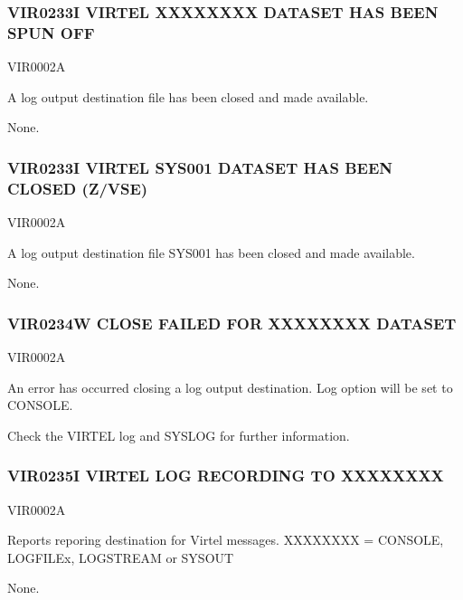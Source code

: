 \documentclass[letterpaper,10pt,english]{sphinxmanual}
\begin{document}
\subsubsection{VIR0233I VIRTEL XXXXXXXX DATASET HAS BEEN SPUN OFF}
\label{\detokenize{messages:vir0233i-virtel-xxxxxxxx-dataset-has-been-spun-off}}\begin{description}
\sphinxAtStartPar
VIR0002A

\sphinxAtStartPar
A log output destination file has been closed and made available.

\sphinxAtStartPar
None.

\end{description}


\subsubsection{VIR0233I VIRTEL SYS001 DATASET HAS BEEN CLOSED (Z/VSE)}
\label{\detokenize{messages:vir0233i-virtel-sys001-dataset-has-been-closed-z-vse}}\begin{description}
\sphinxAtStartPar
VIR0002A

\sphinxAtStartPar
A log output destination file SYS001 has been closed and made available.

\sphinxAtStartPar
None.

\end{description}


\subsubsection{VIR0234W CLOSE FAILED FOR XXXXXXXX DATASET}
\label{\detokenize{messages:vir0234w-close-failed-for-xxxxxxxx-dataset}}\begin{description}
\sphinxAtStartPar
VIR0002A

\sphinxAtStartPar
An error has occurred closing a log output destination. Log option will be set to CONSOLE.

\sphinxAtStartPar
Check the VIRTEL log and SYSLOG for further information.

\end{description}


\subsubsection{VIR0235I VIRTEL LOG RECORDING TO XXXXXXXX}
\label{\detokenize{messages:vir0235i-virtel-log-recording-to-xxxxxxxx}}\begin{description}
\sphinxAtStartPar
VIR0002A

\sphinxAtStartPar
Reports reporing destination for Virtel messages. XXXXXXXX = CONSOLE, LOGFILEx, LOGSTREAM or SYSOUT

\sphinxAtStartPar
None.

\end{description}
\end{document}
